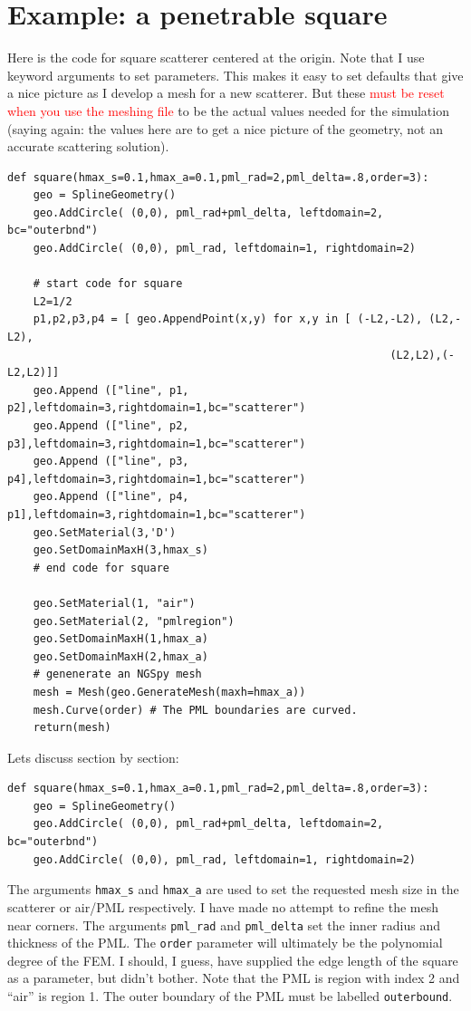 \documentclass[12pt]{article}
\begin{document}
\section{Example: a penetrable square}
Here is the code for square scatterer centered at the origin.  Note that I use keyword arguments to set
parameters.  This makes it easy to set defaults that give a nice picture as I develop a mesh for 
a new scatterer.  But these \textcolor{red}{must be reset when you use the meshing file} to be the actual values 
needed for the simulation (saying again: the values here are to get a nice picture of the geometry, not an accurate scattering solution).
\begin{verbatim}
def square(hmax_s=0.1,hmax_a=0.1,pml_rad=2,pml_delta=.8,order=3):
    geo = SplineGeometry()
    geo.AddCircle( (0,0), pml_rad+pml_delta, leftdomain=2, bc="outerbnd")
    geo.AddCircle( (0,0), pml_rad, leftdomain=1, rightdomain=2)
    
    # start code for square
    L2=1/2
    p1,p2,p3,p4 = [ geo.AppendPoint(x,y) for x,y in [ (-L2,-L2), (L2,-L2),
                                                           (L2,L2),(-L2,L2)]]
    geo.Append (["line", p1, p2],leftdomain=3,rightdomain=1,bc="scatterer")
    geo.Append (["line", p2, p3],leftdomain=3,rightdomain=1,bc="scatterer")
    geo.Append (["line", p3, p4],leftdomain=3,rightdomain=1,bc="scatterer")
    geo.Append (["line", p4, p1],leftdomain=3,rightdomain=1,bc="scatterer")
    geo.SetMaterial(3,'D')
    geo.SetDomainMaxH(3,hmax_s)
    # end code for square
    
    geo.SetMaterial(1, "air")
    geo.SetMaterial(2, "pmlregion")
    geo.SetDomainMaxH(1,hmax_a)
    geo.SetDomainMaxH(2,hmax_a)
    # genenerate an NGSpy mesh
    mesh = Mesh(geo.GenerateMesh(maxh=hmax_a))
    mesh.Curve(order) # The PML boundaries are curved.
    return(mesh)
\end{verbatim}
Lets discuss section by section:
\begin{verbatim}
def square(hmax_s=0.1,hmax_a=0.1,pml_rad=2,pml_delta=.8,order=3):
    geo = SplineGeometry()
    geo.AddCircle( (0,0), pml_rad+pml_delta, leftdomain=2, bc="outerbnd")
    geo.AddCircle( (0,0), pml_rad, leftdomain=1, rightdomain=2)
\end{verbatim}
The arguments \verb+hmax_s+ and \verb+hmax_a+ are used to set the requested mesh size in the 
scatterer or air/PML respectively.  I have made no attempt to refine the mesh near corners.
The arguments \verb+pml_rad+ and \verb+pml_delta+ set the inner radius and thickness of the PML. The \verb+order+ parameter will ultimately be the polynomial degree of the FEM.  I should, I guess, have supplied the edge length of the square as a parameter, but didn't bother.  Note that the PML is region with index 2 and ``air'' is region 1.  The outer boundary of the PML must be labelled \verb+outerbound+.
\end{document}
